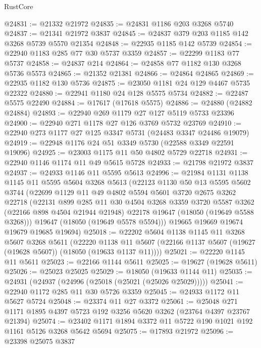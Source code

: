 \begin{lexlean}{RustCore}
\begin{coremodule}
@24831 := @21332 @21972
@24835 := @24831 @1186 @203 @3268 @5740
@24837 := @21341 @21972 @3837
@24845 := @24837 @379 @203 @1185 @142 @3268 @5739 @5570 @21354
@24848 := @22935 @1185 @142 @5739
@24854 := @22940 @1183 @285 @77 @30 @5737 @3359
@24857 := @22299 @1183 @77 @5737
@24858 := @24837 @214
@24864 := @24858 @77 @1182 @130 @3268 @5736 @5573
@24865 := @21352 @21381
@24866 := @24864 @24865
@24869 := @22935 @1182 @130 @5736
@24875 := @23050 @1181 @24 @129 @4467 @5735 @22322
@24880 := @22941 @1180 @24 @128 @5575 @5734
@24882 := @22487 @5575 @22490
@24884 := @17617 (@17618 @5575)
@24886 := @24880 (@24882 @24884)
@24893 := @22940 @269 @1179 @27 @127 @5119 @5733 @23396
@24900 := @22940 @271 @1178 @27 @126 @3769 @5732 @23769
@24910 := @22940 @273 @1177 @27 @125 @3347 @5731 (@24483 @3347 @24486 @19079)
@24919 := @22948 @1176 @24 @51 @3349 @5730 (@22588 @3349 @22591 @19096)
@24925 := @23003 @1175 @11 @50 @4802 @5729 @22718
@24931 := @22940 @1146 @1174 @11 @49 @5615 @5728
@24933 := @21798 @21972 @3837
@24937 := @24933 @1146 @11 @5595 @5613
@24996 := @21984
    @1131
    @1138
    @1145
    @11
    @5595
    @5604
    @3268
    @5613
    (@22123
      @1130
      @50
      @13
      @5595
      @5602
      @3744
      (@22699
        @1129
        @11
        @49
        @4802
        @5594
        @5601
        @3720
        @2675
        @3262
        @22718
        (@22131
          @899
          @285
          @11
          @30
          @4504
          @3268
          @3359
          @3720
          @5587
          @3262
          (@22166 @898 @4504 @21944 @21948)
          @22178
          @19647
          (@18050 (@19649 @5588 @3268)))
        @19647
        (@18050 (@19649 @5578 @5594)))
      @19665
      @19669
      @19674
      @19679
      @19685
      @19694)
@25018 := @22202
    @5604
    @1138
    @1145
    @11
    @3268
    @5607
    @3268
    @5611
    (@22220
      @1138
      @11
      @5607
      (@22166 @1137 @5607 (@19627 (@19628 @5607)) (@18050 (@19633 @1137 @11))))
@25021 := @22220 @1145 @11 @5611
@25023 := @22166 @1144 @5611
@25025 := @19627 (@19628 @5611)
@25026 := @25023 @25025
@25029 := @18050 (@19633 @1144 @11)
@25035 := @24931 (@24937 (@24996 (@25018 (@25021 (@25026 @25029)))))
@25041 := @22940 @1172 @285 @11 @30 @5726 @3359
@25045 := @24933 @1172 @11 @5627 @5724
@25048 := @23374 @11 @27 @3372
@25061 := @25048 @271 @1171 @1895 @4397 @5723 @192 @3256 @5620 @3262 (@23764 @4397 @23767 @21394)
@25074 := @23402 @1171 @1894 @3372 @11 @5722 @190 @1021 @192 @1161 @5126 @3268 @5642 @5694
@25075 := @17893 @21972
@25096 := @23398
    @25075
    @3837

\end{coremodule}
\end{lexlean}
